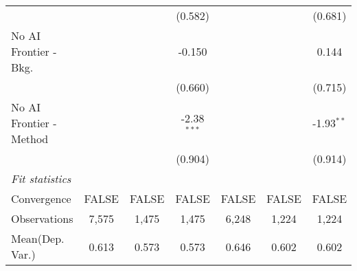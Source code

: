 \begin{tabular}{lcccccc}
                           &               &         & (0.582)       &               &         & (0.681)\\   
   No AI Frontier - Bkg.   &               &         & -0.150        &               &         & 0.144\\   
                           &               &         & (0.660)       &               &         & (0.715)\\   
   No AI Frontier - Method &               &         & -2.38$^{***}$ &               &         & -1.93$^{**}$\\   
                           &               &         & (0.904)       &               &         & (0.914)\\   
   \midrule
   \emph{Fit statistics}\\
   Convergence             &FALSE          & FALSE   & FALSE         & FALSE         & FALSE   & FALSE\\  
   Observations            & 7,575         & 1,475   & 1,475         & 6,248         & 1,224   & 1,224\\  
Mean(Dep. Var.) & 0.613 & 0.573 & 0.573 & 0.646 & 0.602 & 0.602 \\
   

\end{tabular}
